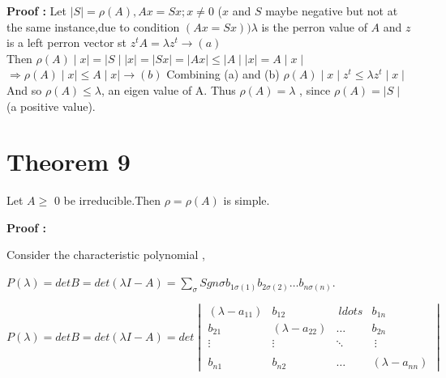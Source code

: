{\bf Proof :}
Let  $\mid S \mid =\rho (A) , Ax = Sx ; x \neq  0 $ ($x$ and $S$ maybe negative but not at the same instance,due to condition 
$(Ax = Sx))\lambda $ is the perron value of $A$ and $z$ is a left perron vector st $z^{t}A = \lambda  z^{t}\longrightarrow (a)$
\\Then $\rho(A) \mid x \mid = \mid S\mid \mid x \mid=\mid Sx \mid=\mid Ax \mid \leq \mid A \mid \mid x \mid =  A \mid x \mid$
$\Rightarrow \rho(A) \mid x \mid \leq  A \mid x \mid  \longrightarrow (b)$
Combining (a) and (b) $\rho(A)\mid x \mid z^{t} \leq \lambda z^{t} \mid x\mid$ 
And so $\rho(A)  \leq \lambda $, an eigen value of A.
Thus $\rho(A)= \lambda$ , since $\rho(A)= \mid S \mid$ (a positive value).


\section{Theorem 9}

Let $ A\geq $ 0 be irreducible.Then $\rho = \rho(A)$ is simple.

{\bf Proof :}

Consider the characteristic polynomial ,

$ P(\lambda ) =  det B = det(\lambda I - A)=\sum _{\sigma }Sgn\sigma b_{1\sigma {(1)}} b_{2\sigma {(2)}}\ldots b_{n\sigma {(n)}}$.

$ P(\lambda ) =  det B = det(\lambda I - A)
              =  det \begin{vmatrix}(\lambda -a_{11})&b_{12}&\ ldots &b_{1n}\\b_{21}&(\lambda -a_{22})&\ldots&b_{2n}\\
                                       \vdots& \vdots&\ddots&\ \vdots\\\\b_{n1}&b_{n2}&\ldots&(\lambda -a_{nn}) 
                      \end{vmatrix}$


